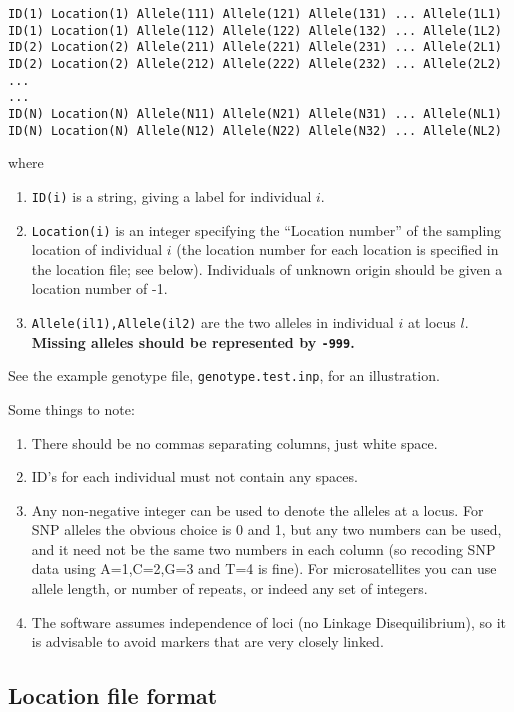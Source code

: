\documentclass[11pt,titlepage,times,letterpaper]{article}
\begin{document}
\begin{verbatim}
ID(1) Location(1) Allele(111) Allele(121) Allele(131) ... Allele(1L1)
ID(1) Location(1) Allele(112) Allele(122) Allele(132) ... Allele(1L2)
ID(2) Location(2) Allele(211) Allele(221) Allele(231) ... Allele(2L1)
ID(2) Location(2) Allele(212) Allele(222) Allele(232) ... Allele(2L2)
...
...
ID(N) Location(N) Allele(N11) Allele(N21) Allele(N31) ... Allele(NL1)
ID(N) Location(N) Allele(N12) Allele(N22) Allele(N32) ... Allele(NL2)
\end{verbatim}
where
\begin{enumerate}
\item{\tt ID(i)} is a string, giving a label for individual $i$.
\item{\tt Location(i)} is an integer specifying the ``Location number'' of
the sampling location
of individual $i$ (the location number for each location 
is specified in the location file; see below). Individuals of unknown
origin should be given a location number of -1.
\item{{\tt Allele(il1),Allele(il2)}} are the two alleles in
individual $i$ at locus $l$. {\bf Missing alleles should
be represented by {\tt -999}.}
\end{enumerate}
See the example genotype file, {\tt genotype.test.inp}, for an illustration.

Some things to note:
\begin{enumerate}
\item There should be no commas separating columns, just white space.
\item ID's for each individual must not contain any spaces.
\item Any non-negative integer can be used to denote the alleles at a locus.
For SNP alleles the obvious choice is 0 and 1, but any two numbers can be used,
and it need not be the same two numbers in each column (so recoding SNP data 
using A=1,C=2,G=3 and T=4 is fine).  For microsatellites you can use 
allele length, or number of repeats, or indeed any set of integers.
\item The software assumes independence of loci (no Linkage Disequilibrium),
so it is advisable to avoid markers that are very closely linked.
\end{enumerate}

\subsection{Location file format}
\end{document}
